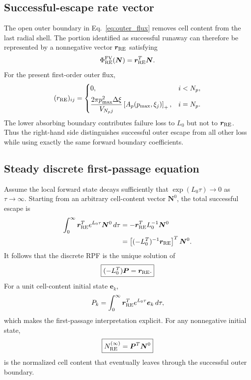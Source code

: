 \documentclass[11pt]{article}
\begin{document}
\subsection{Successful-escape rate vector}
\label{sec:rpf_success_vector}

The open outer boundary in Eq.~\eqref{eq:outer_flux} removes cell content from the last
radial shell.  The portion identified as successful runaway can therefore be represented
by a nonnegative vector $\bm r_{\rm RE}$ satisfying
\begin{equation}
 \Phi_{\rm RE}^{\rm FV}(\bm N)=\bm r_{\rm RE}^T\bm N.
 \label{eq:rpf_discrete_success_flux}
\end{equation}
For the present first-order outer flux,
\begin{equation}
 (r_{\rm RE})_{ij}
 =\begin{cases}
 0, & i<N_p,\\[4pt]
 \displaystyle
 \frac{2\pi p_{\max}^2\Delta\xi}{V_{N_pj}}
 \left[A_p(p_{\max},\xi_j)\right]_+,
 & i=N_p.
 \end{cases}
 \label{eq:rpf_success_rate_vector}
\end{equation}
The lower absorbing boundary contributes failure loss to $L_0$ but not to
$\bm r_{\rm RE}$.  Thus the right-hand side distinguishes successful outer escape from
all other loss while using exactly the same forward boundary coefficients.

\subsection{Steady discrete first-passage equation}
\label{sec:rpf_discrete_equation}

Assume the local forward state decays sufficiently that
$\exp(L_0\tau)\to0$ as $\tau\to\infty$.  Starting from an arbitrary cell-content vector
$\bm N^0$, the total successful escape is
\begin{align}
 \int_0^\infty \bm r_{\rm RE}^T e^{L_0\tau}\bm N^0\,d\tau
 &=-\bm r_{\rm RE}^T L_0^{-1}\bm N^0 \\
 &=\left[(-L_0^T)^{-1}\bm r_{\rm RE}\right]^T\bm N^0.
 \label{eq:rpf_discrete_integral_identity}
\end{align}
It follows that the discrete RPF is the unique solution of
\begin{equation}
 \boxed{
 (-L_0^T)\bm P=\bm r_{\rm RE}.
 }
 \label{eq:rpf_discrete_linear_system}
\end{equation}
For a unit cell-content initial state $\bm e_k$,
\begin{equation}
 P_k
 =\int_0^\infty
   \bm r_{\rm RE}^T e^{L_0\tau}\bm e_k\,d\tau,
 \label{eq:rpf_cell_probability}
\end{equation}
which makes the first-passage interpretation explicit.  For any nonnegative initial
state,
\begin{equation}
 \boxed{
 N_{\rm RE}^{(\infty)}=\bm P^T\bm N^0
 }
 \label{eq:rpf_discrete_response}
\end{equation}
is the normalized cell content that eventually leaves through the successful outer
boundary.
\end{document}

